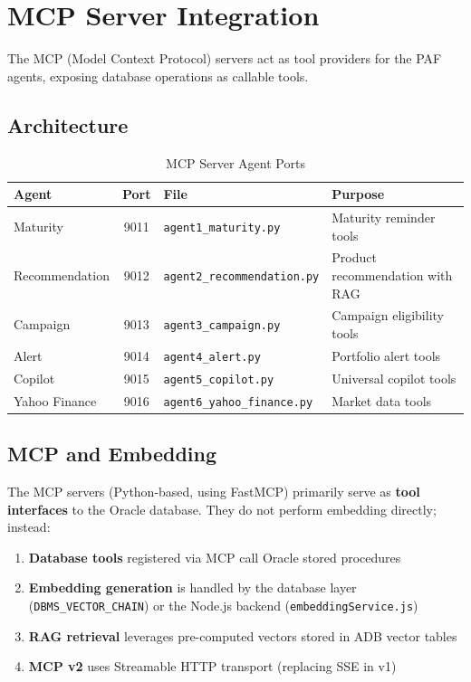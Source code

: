 \documentclass[12pt,a4paper]{article}
\begin{document}
\section{MCP Server Integration}
\label{sec:mcp}

The MCP (Model Context Protocol) servers act as tool providers for the PAF agents, exposing database operations as callable tools.

\subsection{Architecture}

\begin{table}[H]
\centering
\caption{MCP Server Agent Ports}
\begin{tabularx}{\textwidth}{l c l X}
\toprule
\textbf{Agent} & \textbf{Port} & \textbf{File} & \textbf{Purpose} \\
\midrule
Maturity & 9011 & \texttt{agent1\_maturity.py} & Maturity reminder tools \\
Recommendation & 9012 & \texttt{agent2\_recommendation.py} & Product recommendation with RAG \\
Campaign & 9013 & \texttt{agent3\_campaign.py} & Campaign eligibility tools \\
Alert & 9014 & \texttt{agent4\_alert.py} & Portfolio alert tools \\
Copilot & 9015 & \texttt{agent5\_copilot.py} & Universal copilot tools \\
Yahoo Finance & 9016 & \texttt{agent6\_yahoo\_finance.py} & Market data tools \\
\bottomrule
\end{tabularx}
\end{table}

\subsection{MCP and Embedding}

The MCP servers (Python-based, using FastMCP) primarily serve as \textbf{tool interfaces} to the Oracle database. They do not perform embedding directly; instead:

\begin{enumerate}[label=\arabic*.]
  \item \textbf{Database tools} registered via MCP call Oracle stored procedures
  \item \textbf{Embedding generation} is handled by the database layer (\texttt{DBMS\_VECTOR\_CHAIN}) or the Node.js backend (\texttt{embeddingService.js})
  \item \textbf{RAG retrieval} leverages pre-computed vectors stored in ADB vector tables
  \item \textbf{MCP v2} uses Streamable HTTP transport (replacing SSE in v1)
\end{enumerate}
\end{document}
